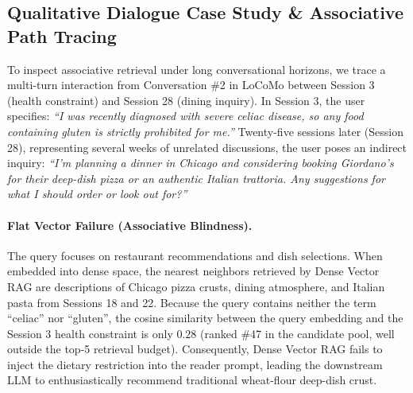 \documentclass[conference]{IEEEtran}
\begin{document}
\begin{table}[t]
\centering
{}
\caption{Downstream closed-loop LLM generative question answering performance on LoCoMo.}
\label{tab:closed_loop}
\end{table}
\enlargethispage{2\baselineskip}

\subsection{Qualitative Dialogue Case Study \& Associative Path Tracing}

To inspect associative retrieval under long conversational horizons, we trace a multi-turn interaction from Conversation \#2 in LoCoMo between Session 3 (health constraint) and Session 28 (dining inquiry). In Session 3, the user specifies: \textit{``I was recently diagnosed with severe celiac disease, so any food containing gluten is strictly prohibited for me.''} Twenty-five sessions later (Session 28), representing several weeks of unrelated discussions, the user poses an indirect inquiry: \textit{``I'm planning a dinner in Chicago and considering booking Giordano's for their deep-dish pizza or an authentic Italian trattoria. Any suggestions for what I should order or look out for?''}

\paragraph{Flat Vector Failure (Associative Blindness).}
The query focuses on restaurant recommendations and dish selections. When embedded into dense space, the nearest neighbors retrieved by Dense Vector RAG are descriptions of Chicago pizza crusts, dining atmosphere, and Italian pasta from Sessions 18 and 22. Because the query contains neither the term ``celiac'' nor ``gluten'', the cosine similarity between the query embedding and the Session 3 health constraint is only $0.28$ (ranked \#47 in the candidate pool, well outside the top-5 retrieval budget). Consequently, Dense Vector RAG fails to inject the dietary restriction into the reader prompt, leading the downstream LLM to enthusiastically recommend traditional wheat-flour deep-dish crust.
\end{document}
